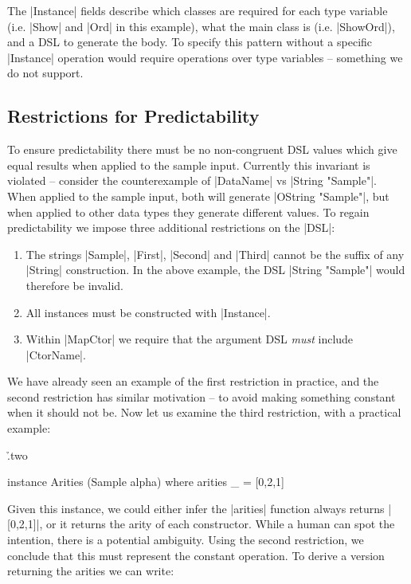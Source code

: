 \documentclass[preprint,draft]{sigplanconf}
\begin{document}
The |Instance| fields describe which classes are required for each type variable (i.e. |Show| and |Ord| in this example), what the main class is (i.e. |ShowOrd|), and a DSL to generate the body. To specify this pattern without a specific |Instance| operation would require operations over type variables -- something we do not support.

\subsection{Restrictions for Predictability}
\label{sec:predictability}

To ensure predictability there must be no non-congruent DSL values which give equal results when applied to the sample input. Currently this invariant is violated -- consider the counterexample of |DataName| vs |String "Sample"|. When applied to the sample input, both will generate |OString "Sample"|, but when applied to other data types they generate different values. To regain predictability we impose three additional restrictions on the |DSL|:

\begin{enumerate}
\item The strings |Sample|, |First|, |Second| and |Third| cannot be the suffix of any |String| construction. In the above example, the DSL |String "Sample"| would therefore be invalid.
\item All instances must be constructed with |Instance|.
\item Within |MapCtor| we require that the argument DSL \textit{must} include |CtorName|.
\end{enumerate}

We have already seen an example of the first restriction in practice, and the second restriction has similar motivation -- to avoid making something constant when it should not be. Now let us examine the third restriction, with a practical example:

\h{.two}\begin{code}
instance Arities (Sample alpha) where
    arities _ = [0,2,1]
\end{code}

Given this instance, we could either infer the |arities| function always returns |[0,2,1]|, or it returns the arity of each constructor. While a human can spot the intention, there is a potential ambiguity. Using the second restriction, we conclude that this must represent the constant operation. To derive a version returning the arities we can write:
\end{document}
